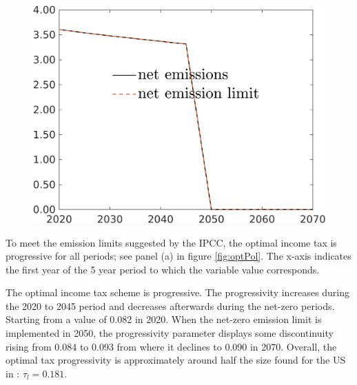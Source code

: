\begin{figure}[h!!]
\begin{minipage}[]{0.32\textwidth}
	\end{minipage}
\begin{minipage}[]{0.32\textwidth}
	\includegraphics[width=1\textwidth]{../../codding_model/own_basedOnFried/optimalPol_010922_revision/figures/all_13Sept22_Tplus30/Single_OPT_T_NoTaus_Emnet_regime0_spillover0_knspil0_noskill0_sep0_xgrowth0_extern0_PV1_sizeequ0_GOV0_etaa0.79.png}
\end{minipage}
\end{figure} 


To meet the emission limits suggested by the IPCC, the optimal income tax is progressive for all periods; see panel (a) in figure \ref{fig:optPol}.  The x-axis indicates the first year of the 5 year period to which the variable value corresponds. 

The optimal income tax scheme is progressive. The progressivity  increases during the 2020 to 2045 period and decreases afterwards during the net-zero periods. Starting from a value of 0.082 in 2020. When the net-zero emission limit is implemented in 2050, the progressivity parameter displays some discontinuity rising from 0.084 to 0.093 from where it  declines to 0.090 in 2070.
Overall, the optimal tax progressivity is approximately  around half the size found for the US in \cite{Heathcote2017OptimalFramework}: $\tau_{l}=0.181$.

